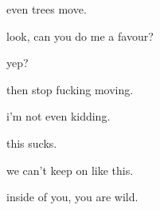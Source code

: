\documentclass[extrafontsizes, 48pt]{memoir}
\newcommand\blankpage{%
    \null
    \thispagestyle{empty}%
    \addtocounter{page}{-1}%
    \newpage}
\begin{document}
	\begin{minipage}{.6\textwidth}
	even trees move.
	\end{minipage}
	\newpage

	\begin{minipage}{.6\textwidth}
	look, can you do me a favour?
	\end{minipage}
	\newpage

	\begin{minipage}{.6\textwidth}
	yep?
	\end{minipage}
	\newpage

	\begin{minipage}{.6\textwidth}
	then stop fucking moving.
	\afterpage{\blankpage}
	\end{minipage}
	\newpage

	\begin{minipage}{.6\textwidth}
	i'm not even kidding.
	\end{minipage}
	\newpage

	\begin{minipage}{.6\textwidth}
	this sucks.
	\afterpage{\blankpage}
	\end{minipage}
	\newpage

	\begin{minipage}{.6\textwidth}
	we can't keep on like this.
	\end{minipage}
	\newpage

	\begin{minipage}{.6\textwidth}
	inside of you, you are wild.
	\end{minipage}
	\newpage
\end{document}
